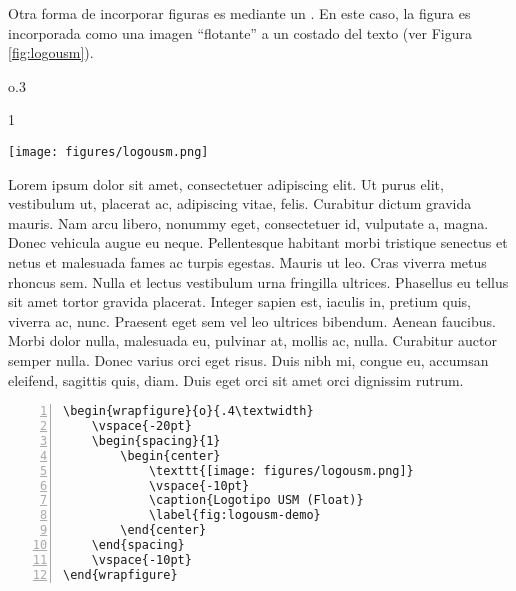 Otra forma de incorporar figuras es mediante un . En este caso, la figura es incorporada como una imagen ``flotante'' a un costado del texto  (ver Figura \autoref{fig:logousm}).

\begin{wrapfigure}{o}{.3\textwidth}
    \vspace{-20pt}
    \begin{spacing}{1}
        \begin{center}
            \texttt{[image: figures/logousm.png]}
            \vspace{-10pt}
            \caption{Logotipo USM (Float)}
            \label{fig:logousm}
        \end{center}
    \end{spacing}
    \vspace{-10pt}
\end{wrapfigure}

Lorem ipsum dolor sit amet, consectetuer adipiscing elit. Ut purus elit, vestibulum ut, placerat ac, adipiscing vitae, felis. Curabitur dictum gravida mauris. Nam arcu libero, nonummy eget, consectetuer id, vulputate a, magna. Donec vehicula augue eu neque. Pellentesque habitant morbi tristique senectus et netus et malesuada fames ac turpis egestas. Mauris ut leo. Cras viverra metus rhoncus sem. Nulla et lectus vestibulum urna fringilla ultrices. Phasellus eu tellus sit amet tortor gravida placerat. Integer sapien est, iaculis in, pretium quis, viverra ac, nunc. Praesent eget sem vel leo ultrices bibendum. Aenean faucibus. Morbi dolor nulla, malesuada eu, pulvinar at, mollis ac, nulla. Curabitur auctor semper nulla. Donec varius orci eget risus. Duis nibh mi, congue eu, accumsan eleifend, sagittis quis, diam. Duis eget orci sit amet orci dignissim rutrum.



\begin{Verbatim}[frame=lines, label=\autoref{fig:logousm}
				, fontsize=\footnotesize, numbers=left
				, baselinestretch=1
				, formatcom=\color{gray}]
\begin{wrapfigure}{o}{.4\textwidth}
    \vspace{-20pt}
    \begin{spacing}{1}
        \begin{center}
            \texttt{[image: figures/logousm.png]}
            \vspace{-10pt}
            \caption{Logotipo USM (Float)}
            \label{fig:logousm-demo}
        \end{center}
    \end{spacing}
    \vspace{-10pt}
\end{wrapfigure}
\end{Verbatim}


